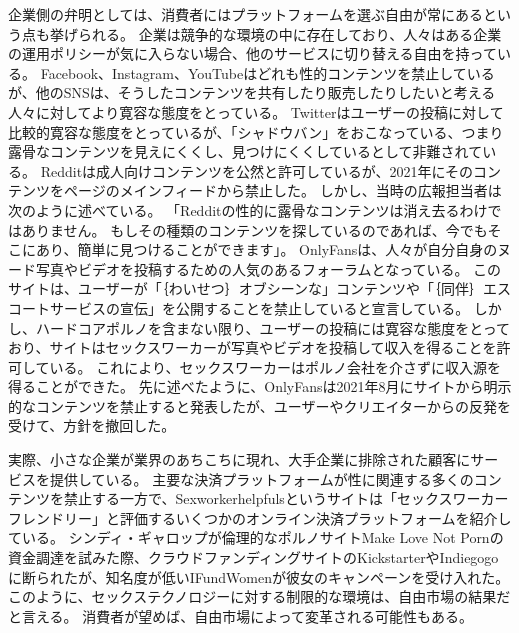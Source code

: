 \documentclass[paper=a4,book,openany]{jlreq}
\begin{document}
企業側の弁明としては、消費者にはプラットフォームを選ぶ自由が常にあるという点も挙げられる。
企業は競争的な環境の中に存在しており、人々はある企業の運用ポリシーが気に入らない場合、他のサービスに切り替える自由を持っている。
Facebook、Instagram、YouTubeはどれも性的コンテンツを禁止しているが、他のSNSは、そうしたコンテンツを共有したり販売したりしたいと考える人々に対してより寛容な態度をとっている。
Twitterはユーザーの投稿に対して比較的寛容な態度をとっているが、「シャドウバン」をおこなっている、つまり露骨なコンテンツを見えにくくし、見つけにくくしているとして非難されている\citep{valens20:_repor_says_shadow_is_real}。
Redditは成人向けコンテンツを公然と許可しているが、2021年にそのコンテンツをページのメインフィードから禁止した。
しかし、当時の広報担当者は次のように述べている。
「Redditの性的に露骨なコンテンツは消え去るわけではありません。
もしその種類のコンテンツを探しているのであれば、今でもそこにあり、簡単に見つけることができます」\citep{sosa11:_remov_sexual_explic_conten}。
OnlyFansは、人々が自分自身のヌード写真やビデオを投稿するための人気のあるフォーラムとなっている。
このサイトは、ユーザーが「｛わいせつ｝{オブシーン}な」コンテンツや「｛同伴｝{エスコート}サービスの宣伝」を公開することを禁止していると宣言している。
しかし、ハードコアポルノを含まない限り、ユーザーの投稿には寛容な態度をとっており、サイトはセックスワーカーが写真やビデオを投稿して収入を得ることを許可している。
これにより、セックスワーカーはポルノ会社を介さずに収入源を得ることができた\citep{bernstein19:_how_onlyf_chang_sex_work_forev}。
先に述べたように、OnlyFansは2021年8月にサイトから明示的なコンテンツを禁止すると発表したが、ユーザーやクリエイターからの反発を受けて、方針を撤回した。

実際、小さな企業が業界のあちこちに現れ、大手企業に排除された顧客にサービスを提供している。
主要な決済プラットフォームが性に関連する多くのコンテンツを禁止する一方で、Sexworkerhelpfulsというサイトは「セックスワーカーフレンドリー」と評価するいくつかのオンライン決済プラットフォームを紹介している\citep{sexworkerhelpfuls.com18:_sex_work_approv_paymen_option}。
シンディ・ギャロップが倫理的なポルノサイトMake Love Not Pornの資金調達を試みた際、クラウドファンディングサイトのKickstarterやIndiegogoに断られたが、知名度が低いIFundWomenが彼女のキャンペーンを受け入れた\citep{gardezi16:_cindy_gallop_journ_normal_dialog_aroun_sex}。
このように、セックステクノロジーに対する制限的な環境は、自由市場の結果だと言える。
消費者が望めば、自由市場によって変革される可能性もある。
\end{document}
